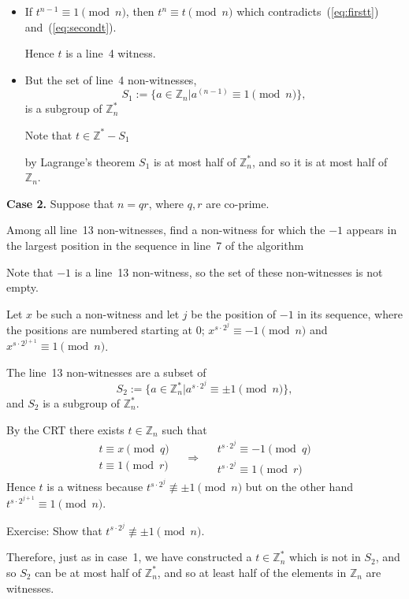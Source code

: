 \begin{frame}

\begin{itemize}
\item  If $t^{n-1}\equiv 1\pmod n$,
then $t^n\equiv t\pmod n$ which contradicts~(\ref{eq:firstt})
and~(\ref{eq:secondt}).  

Hence $t$ is a line~4 witness.  

\item  But the set of
line~4 non-witnesses, 
$$
S_1:=\{a\in\mathbb{Z}_n|a^{(n-1)}\equiv 1\pmod n\},
$$
is a  subgroup of $\mathbb{Z}_n^*$

Note that $t\in\mathbb{Z}^*-S_1$

by Lagrange's theorem $S_1$ is at
most half of $\mathbb{Z}_n^*$, and so it is at most half of
$\mathbb{Z}_n$.
\end{itemize}

\end{frame}

\begin{frame}

{\bf Case 2.}  Suppose that $n=qr$, where $q,r$ are co-prime.

Among all line~13 non-witnesses, find a non-witness for which the
$-1$ appears in the largest position in the sequence in line~7 of the
algorithm 

Note that $-1$ is a line~13 non-witness, so the set of these
non-witnesses is not empty.  

Let $x$ be such
a non-witness and let $j$ be the position of $-1$ in its sequence,
where the positions are numbered starting at 0;  $x^{s\cdot
2^j}\equiv -1\pmod n$ and $x^{s\cdot 2^{j+1}}\equiv 1\pmod n$.  

The
line~13
non-witnesses are a subset of 
$$
S_2:=\{a\in\mathbb{Z}_n^*|a^{s\cdot 2^j}\equiv\pm 1\pmod n\},
$$
and $S_2$ is a subgroup of
$\mathbb{Z}_n^*$.

\end{frame}

\begin{frame}

By the CRT there exists $t\in\mathbb{Z}_n$ such that
$$
\begin{array}{l}
t\equiv x\pmod q \\
t\equiv 1\pmod r
\end{array}
\quad\Rightarrow\quad
\begin{array}{l}
t^{s\cdot 2^j}\equiv -1\pmod q \\
t^{s\cdot 2^j}\equiv 1\pmod r
\end{array}
$$
Hence $t$ is a witness because $t^{s\cdot 2^j}\not\equiv\pm 1\pmod
n$  but on the other hand $t^{s\cdot 2^{j+1}}\equiv 1\pmod n$.  

Exercise: Show that $t^{s\cdot 2^j}\not\equiv\pm 1\pmod n$.

Therefore, just as in case~1, we have constructed a
$t\in\mathbb{Z}_n^*$ which is not in $S_2$, and so $S_2$ can be at
most half of $\mathbb{Z}_n^*$, and so at least half of the elements in
$\mathbb{Z}_n$ are witnesses.
\end{frame}

